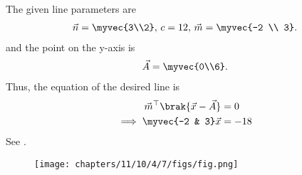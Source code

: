 		The given line
parameters are
\begin{align}
		\vec{n} = \myvec{3\\2},\, c=12 ,\,
	\vec{m} =\myvec{-2 \\ 3}.
\end{align}
and the point on the y-axis is
\begin{align}
	\vec{A} =\myvec{0\\6}.
\end{align}
Thus, the equation of the desired line is 
\begin{align}
	\vec{m}^\top\brak{\vec{x}-\vec{A}}&=0\label{eq:chapters/11/10/4/7/5}
	\\
\implies
			\myvec{-2 & 3}\vec{x} &=-18
		\end{align}
		See 
  .
\begin{figure}[H]
\texttt{[image: chapters/11/10/4/7/figs/fig.png]}
\caption{}
  \label{fig:chapters/11/10/4/7/Figure}
\end{figure}
